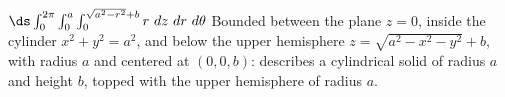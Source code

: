 {
$\ds \int_0^{2\pi}\int_0^a\int_0^{\sqrt{a^2-r^2}+b} r\ dz\ dr\ d\theta$
}
{Bounded between the plane $z=0$, inside the cylinder $x^2+y^2 = a^2$, and below the upper hemisphere $z= \sqrt{a^2-x^2-y^2}+b$, with radius $a$ and centered at $(0,0,b)$: describes a cylindrical solid of radius $a$ and height $b$, topped with the upper hemisphere of radius $a$.
}
